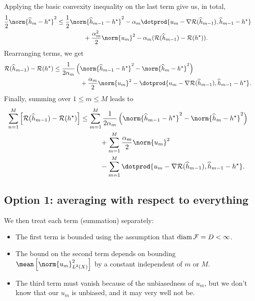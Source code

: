 Applying the basic convexity inequality on the last term give us, in total,
\begin{align*}
    \frac{ 1 }{ 2 } \norm{ \hat{ h }_{ m } - \hstar }^2
    &\leq
    \frac{ 1 }{ 2 } \norm{ \hat{ h }_{ m-1 } - \hstar }^2
    - \alpha_{ m } \dotprod{ u_{ m } - \nabla \risk ( \hat{ h }_{ m-1 } ), \hat{ h }_{ m-1 } - \hstar } \\
    &\hspace{1.5cm}
    + \frac{ \alpha_{ m }^2 }{ 2 } \norm{ u_{ m } }^2
    - \alpha_{ m } ( \risk ( \hat{ h }_{ m-1 } ) - \risk ( \hstar ) )
.\end{align*}
Rearranging terms, we get
\begin{align*}
    \risk ( \hat{ h }_{ m-1 } ) - \risk ( \hstar )
    &\leq
    \frac{ 1 }{ 2 \alpha_{ m } } \left(
        \norm{ \hat{ h }_{ m-1 } - \hstar }^2
        -
        \norm{ \hat{ h }_{ m } - \hstar }^2
    \right) \\
    &\hspace{1.5cm}+ \frac{ \alpha_{ m } }{ 2 } \norm{ u_{ m } }^2
    - \dotprod{ u_{ m } - \nabla \risk ( \hat{ h }_{ m-1 } ), \hat{ h }_{ m-1 } - \hstar }
.\end{align*}
Finally, summing over $ 1 \leq m \leq M $ leads to
\begin{align*}
    \sum_{ n=1 }^{ M } \left[
        \risk ( \hat{ h }_{ m-1 } ) - \risk ( \hstar )
    \right]
    &\leq \sum_{ m=1 }^{ M } \frac{ 1 }{ 2 \alpha_{ m } } \left(
        \norm{ \hat{ h }_{ m-1 } - \hstar }^2
        -
        \norm{ \hat{ h }_{ m } - \hstar }^2
    \right) \\
    &\hspace{1cm} + \sum_{ m=1 }^{ M } \frac{ \alpha_{ m } }{ 2 } \norm{ u_{ m } }^2 \\
    &\hspace{1cm} - \sum_{ m=1 }^{ M }
    \dotprod{ u_{ m } - \nabla \risk ( \hat{ h }_{ m-1 } ), \hat{ h }_{ m-1 } - \hstar }
.\end{align*}


\subsection{Option 1: averaging with respect to everything}


We then treat each term (summation) separately:
\begin{itemize}
    \item The first term is bounded using the assumption that $ \operatorname{diam} \mathcal{F} = D < \infty $.
    \item The bound on the second term depends on bounding $ \mean \left[ \norm{ u_{ m } }^2_{ L^{ 2 } ( X ) } \right] $ by a constant independent of $ m $ or $ M $.
    \item The third term must vanish because of the unbiasedness of $ u_{ m } $, but we don't know that our $ u_{ m } $ is unbiased, and it may very well not be.
\end{itemize}


